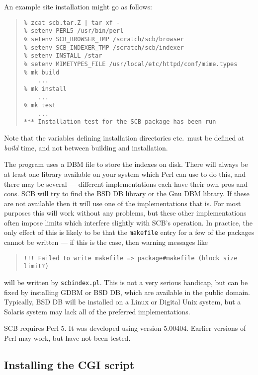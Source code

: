 \documentclass[twoside,11pt]{article}
\newcommand{\xlabel}[1]{}
\renewcommand{\_}{\texttt{\symbol{95}}}
\begin{document}
An example site installation might go as follows:
\begin{quote}
\begin{verbatim}
% zcat scb.tar.Z | tar xf -
% setenv PERL5 /usr/bin/perl
% setenv SCB_BROWSER_TMP /scratch/scb/browser
% setenv SCB_INDEXER_TMP /scratch/scb/indexer
% setenv INSTALL /star
% setenv MIMETYPES_FILE /usr/local/etc/httpd/conf/mime.types
% mk build
    ...
% mk install
    ...
% mk test
    ...
*** Installation test for the SCB package has been run
\end{verbatim}
\end{quote}

Note that the variables defining installation directories 
etc.\ must be defined at {\em build} time, 
and not between building and installation.

The program uses a DBM file to store the indexes on disk.
There will always be at least one library available on your system
which Perl can use to do this, and there may be 
several --- different implementations each have their own pros and cons.  
SCB will try to find 
the BSD DB library or the Gnu DBM library.
If these are not available then it will use one of the implementations
that is.  For most purposes this will work without any problems, but
these other implementations often impose limits which interfere slightly
with SCB's operation. 
In practice, the only effect of this is likely to be that the 
{\tt makefile} entry for a few of the packages cannot be written ---
if this is the case, then warning messages like 
\begin{quote}
\begin{verbatim}
!!! Failed to write makefile => package#makefile (block size limit?)
\end{verbatim}
\end{quote}
will be written by {\tt scbindex.pl}.
This is not a very serious handicap, but can be fixed by 
installing GDBM or BSD DB, which are available in the public domain.
Typically, BSD DB will be installed on a Linux or Digital Unix system,
but a Solaris system may lack all of the preferred implementations. 



SCB requires Perl 5.  It was developed using version 5.004\_04.
Earlier versions of Perl may work, but have not been tested.


\subsection{\xlabel{sec:install-cgi}\label{sec:install-cgi}Installing the CGI script}
\end{document}
